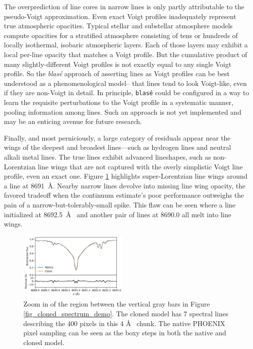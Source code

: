 \documentclass[twocolumn]{aastex631}
\begin{document}
The overprediction of line cores in narrow lines is only partly attributable to the pseudo-Voigt approximation.  Even exact Voigt profiles inadequately represent true atmospheric opacities. Typical stellar and substellar atmosphere models compute opacities for a stratified atmosphere consisting of tens or hundreds of locally isothermal, isobaric atmospheric layers.  Each of those layers may exhibit a local per-line opacity that matches a Voigt profile.  But the cumulative product of many slightly-different Voigt profiles is not exactly equal to any single Voigt profile.  So the \emph{blas\'e} approach of asserting lines as Voigt profiles can be best understood as a phenomenological model-- that lines tend to look Voigt-like, even if they are non-Voigt in detail.  In principle, \texttt{blas\'e} could be configured in a way to learn the requisite perturbations to the Voigt profile in a systematic manner, pooling information among lines.  Such an approach is not yet implemented and may be an enticing avenue for future research.

Finally, and most perniciously, a large category of residuals appear near the wings of the deepest and broadest lines---such as hydrogen lines and neutral alkali metal lines.  The true lines exhibit advanced lineshapes, such as non-Lorentzian line wings that are not captured with the overly simplistic Voigt line profile, even an exact one.  Figure \ref{fig_zoom_cloning_performance} highlights super-Lorentzian line wings around a line at 8691~\AA.  Nearby narrow lines devolve into missing line wing opacity, the favored tradeoff when the continuum estimate's poor performance outweighs the pain of a narrow-but-tolerably-small spike. This flaw can be seen where a line initialized at 8692.5~\AA~ and another pair of lines at 8690.0 all melt into line wings.

\begin{figure}[hbt!]
    \centering
    \includegraphics[width=0.48\textwidth]{blase_clone_demo_zoom.png}
    \caption{Zoom in of the region between the vertical gray bars in Figure \ref{fig_cloned_spectrum_demo}. The cloned model has 7 spectral lines describing the 400 pixels in this 4 \AA~ chunk.  The native PHOENIX pixel sampling can be seen as the boxy steps in both the native and cloned model.  }
    \label{fig_zoom_cloning_performance}
\end{figure}
\end{document}
